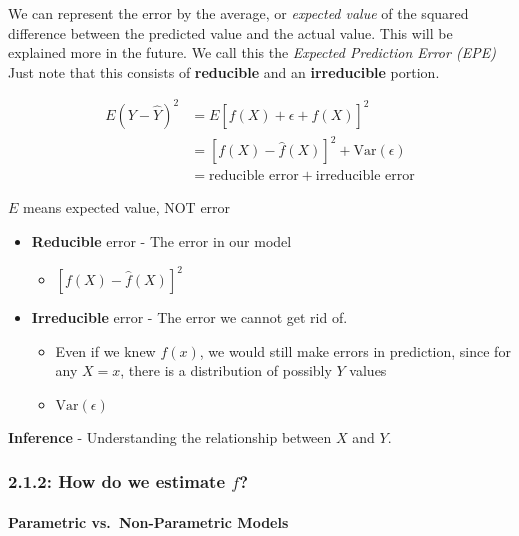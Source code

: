 We can represent the error by the average, or \emph{expected value} of
the squared difference between the predicted value and the actual value.
This will be explained more in the future. We call this the
\emph{Expected Prediction Error (EPE)} Just note that this consists of
\textbf{reducible} and an \textbf{irreducible} portion.

\begin{align*}
E(Y-\hat Y)^2 &= E[f(X) + \epsilon + \hat f(X)]^2 \\
&= [f(X)-\hat f(X)]^2 + \text{Var}(\epsilon)\\
&= \text{reducible error} + \text{irreducible error}
\end{align*}

\begin{note}
    \(E\) means expected value, NOT error
\end{note}

\begin{itemize}
\tightlist
\item
  \textbf{Reducible} error - The error in our model

  \begin{itemize}
  \tightlist
  \item
    \([f(X)-\hat f(X)]^2\)
  \end{itemize}
\item
  \textbf{Irreducible} error - The error we cannot get rid of.

  \begin{itemize}
  \tightlist
  \item
    Even if we knew \(f(x)\), we would still make errors in prediction,     since for any \(X=x\), there is a distribution of possibly \(Y\) values
  \item  \(\text{Var}(\epsilon)\)
  \end{itemize}
\end{itemize}

\textbf{Inference} - Understanding the relationship between \(X\) and
\(Y\).

\subsubsection*{\texorpdfstring{2.1.2: How do we estimate
\(f\)?}{2.1.2: How do we estimate f?}}\label{how-do-we-estimate-f}

\paragraph*{Parametric vs.~Non-Parametric Models}\label{parametric-vs.-non-parametric-models}

